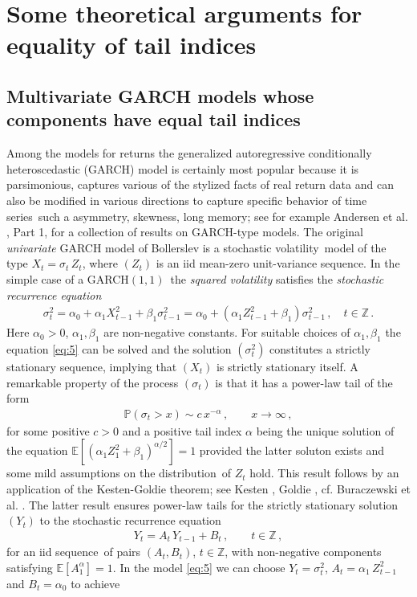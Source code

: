 \documentclass[11pt,a4]{amsart}
\newcommand{\garch}{{\rm GARCH}$(1,1)$}
\newcommand{\ts}{time series}
\newcommand{\sv}{stochastic volatility}
\newcommand{\sre}{stochastic recurrence equation}
\newcommand{\beam}{\begin{eqnarray}}
\newcommand{\eeam}{\end{eqnarray}\noindent}
\newcommand{\xto}{x\to\infty}
\newcommand{\bbz}{{\mathbb Z}}
\newcommand{\ds}{distribution}
\newcommand{\seq}{sequence}
\newcommand{\E }{{\mathbb E}}
\renewcommand{\P }{{\mathbb P}}
\newcommand{\1}{{\mathbf 1}}
\begin{document}
\newpage
\section{Some theoretical arguments for equality of tail indices}\setcounter{equation}{0}\label{sec:2}
\subsection{Multivariate GARCH models whose components have  equal tail indices}\label{subsec:garch}
Among the models for returns the generalized autoregressive conditionally heteroscedastic (GARCH) model
is certainly most popular because it is parsimonious, captures various of the stylized facts of real return data
and can also be modified in various directions to capture specific behavior of \ts\ such a asymmetry, skewness, long memory; 
see for example Andersen et al. \cite{andersen:davis:kreiss:mikosch:2009}, Part 1, for a collection of results
on GARCH-type models.
The original  {\em univariate} GARCH model of Bollerslev \cite{bollerslev:1986} is a \sv\ model of the type $X_t=\sigma_t\,Z_t$, where 
$(Z_t)$ is an iid mean-zero unit-variance \seq . In the simple case of a \garch\ the {\em squared volatility} satisfies the {\em \sre} 
\beam\label{eq:5}
\sigma_t^2= \alpha_0+\alpha_1 X_{t-1}^2+\beta_1\sigma_{t-1}^2=\alpha_0+(\alpha_1Z_{t-1}^2+\beta_1)\sigma_{t-1}^2\,,\quad t\in\bbz\,.
\eeam
Here $\alpha_0>0$, $\alpha_1,\beta_1$ are non-negative constants. For suitable choices of $\alpha_1,\beta_1$ the equation \eqref{eq:5}
can be solved and the solution $(\sigma_t^2)$ constitutes a strictly stationary \seq , implying that $(X_t)$ 
is strictly stationary itself. A remarkable property of the process $(\sigma_t)$ is that it has a power-law tail 
of the form
\beam\label{eq:6}
\P(\sigma_t>x)\sim c\,x^{-\alpha}\,,\qquad \xto\,,
\eeam
for some positive $c>0$ and a positive tail index $\alpha$ being the unique solution of the equation 
$\E [(\alpha_1 Z_1^2+\beta_1)^{\alpha/2}]=1$
provided the latter soluton exists and some mild assumptions on the \ds\ of $Z_t$ hold. This result
follows by an application of the Kesten-Goldie theorem; see Kesten \cite{kesten:1973}, Goldie \cite{goldie:1991}, cf. 
Buraczewski et al. \cite{buraczewski:damek:mikosch:2016}. The latter result ensures power-law tails  for
the strictly stationary  solution $(Y_t)$ to the \sre\ 
\beam\label{eq:7}
Y_t= A_t\,Y_{t-1}+B_t\,,\qquad t\in\bbz\,,
\eeam
for an iid \seq\ of pairs $(A_t,B_t)$, $t\in\bbz$, with non-negative components satisfying $\E [A_1^\alpha]=1$.  
In the model \eqref{eq:5} we can choose $Y_t=\sigma_t^2$, $A_t=\alpha_1\,Z_{t-1}^2$ and $B_t=\alpha_0$ to achieve
\end{document}
